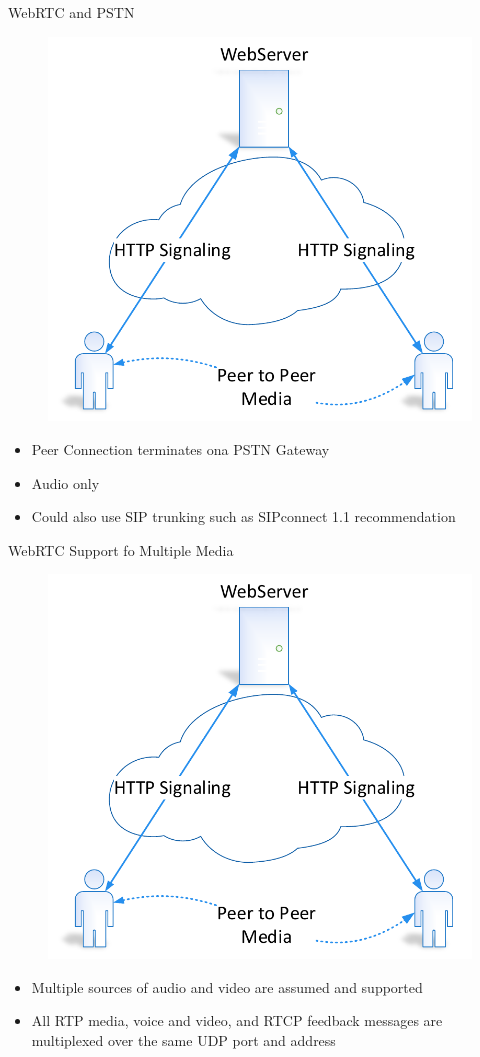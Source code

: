 \begin{frame}{WebRTC and PSTN}
\begin{figure}
\includegraphics[page=7,width=.6\textwidth]{image/webrtc.pdf}
\end{figure}
\begin{itemize}
\item Peer Connection terminates ona PSTN Gateway
\item Audio only
\item Could also use SIP trunking such as SIPconnect 1.1 recommendation
\end{itemize}
\end{frame}

\begin{frame}{WebRTC Support fo Multiple Media}
\begin{figure}
\includegraphics[page=8,width=.6\textwidth]{image/webrtc.pdf}
\end{figure}
\begin{itemize}
\item Multiple sources of audio and video are assumed and supported
\item All RTP media, voice and video, and RTCP feedback messages are multiplexed over the same UDP port and address
\end{itemize}
\end{frame}